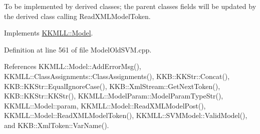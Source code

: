To be implemented by derived classes; the parent classes fields will be updated by the derived class calling Read\+X\+M\+L\+Model\+Token. 



Implements \hyperlink{class_k_k_m_l_l_1_1_model_ab7f1d1441936048db8cec7e9ec987f34}{K\+K\+M\+L\+L\+::\+Model}.



Definition at line 561 of file Model\+Old\+S\+V\+M.\+cpp.



References K\+K\+M\+L\+L\+::\+Model\+::\+Add\+Error\+Msg(), K\+K\+M\+L\+L\+::\+Class\+Assignments\+::\+Class\+Assignments(), K\+K\+B\+::\+K\+K\+Str\+::\+Concat(), K\+K\+B\+::\+K\+K\+Str\+::\+Equal\+Ignore\+Case(), K\+K\+B\+::\+Xml\+Stream\+::\+Get\+Next\+Token(), K\+K\+B\+::\+K\+K\+Str\+::\+K\+K\+Str(), K\+K\+M\+L\+L\+::\+Model\+Param\+::\+Model\+Param\+Type\+Str(), K\+K\+M\+L\+L\+::\+Model\+::param, K\+K\+M\+L\+L\+::\+Model\+::\+Read\+X\+M\+L\+Model\+Post(), K\+K\+M\+L\+L\+::\+Model\+::\+Read\+X\+M\+L\+Model\+Token(), K\+K\+M\+L\+L\+::\+S\+V\+M\+Model\+::\+Valid\+Model(), and K\+K\+B\+::\+Xml\+Token\+::\+Var\+Name().


